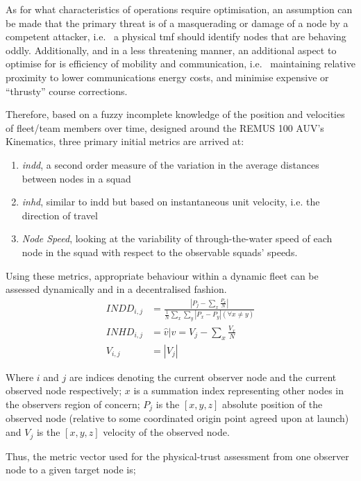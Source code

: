 As for what characteristics of operations require optimisation, an assumption can be made that the primary threat is of a masquerading or damage of a node by a competent attacker, i.e.~ a physical \gls{tmf} should identify nodes that are behaving oddly. 
Additionally, and in a less threatening manner, an additional aspect to optimise for is efficiency of mobility and communication, i.e.~ maintaining relative proximity to lower communications energy costs, and minimise expensive or ``thrusty'' course corrections.

Therefore, based on a fuzzy incomplete knowledge of the position and velocities of fleet/team members over time, designed around the REMUS 100 AUV’s Kinematics, three primary initial metrics are arrived at:

\begin{enumerate}
\item \emph{\acrfull{indd}}, a second order measure of the variation in the average distances between nodes in a squad
\item \emph{\acrfull{inhd}}, similar to \gls{indd} but based on instantaneous unit velocity, i.e. the direction of travel
\item \emph{Node Speed}, looking at the variability of through-the-water speed of each node in the squad with respect to the observable squads’ speeds.
\end{enumerate}
Using these metrics, appropriate behaviour within a dynamic fleet can be assessed dynamically and in a decentralised fashion.
\begin{align}
INDD_{i,j} &= \frac{|P_j - \sum_x \frac{P_x}{N}|}{\frac{1}{N}\sum_x \sum_y{|P_x - P_y| (\forall x \neq y)}}\\
INHD_{i,j} &= \hat{v} \vert v= V_j - \sum_x{\frac{V_x}{N}}\\
V_{i,j} &= |V_j|
\end{align}

Where $i$ and $j$ are indices denoting the current observer node and the current observed node respectively; $x$ is a summation index representing other nodes in the observers region of concern; $P_{j}$ is the $[x,y,z]$ absolute position of the observed node (relative to some coordinated origin point agreed upon at launch) and $V_{j}$ is the $[x,y,z]$ velocity of the observed node.

Thus, the metric vector used for the physical-trust assessment from one observer node to a given target node is;

